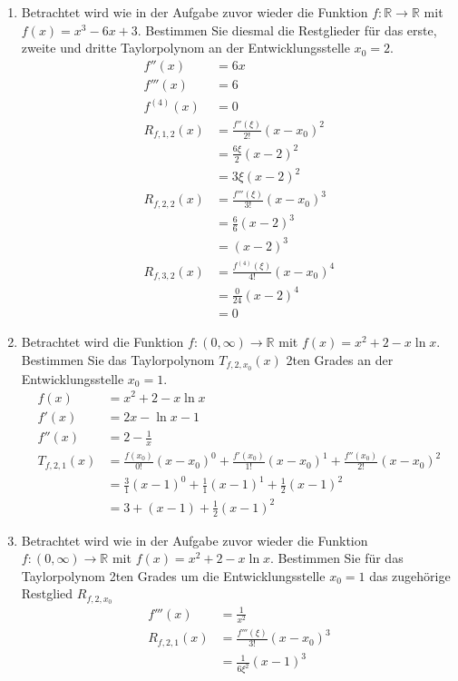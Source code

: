 \documentclass[12pt]{article}
\begin{document}
\begin{enumerate}[start=1,label={\bfseries Frage \arabic*:},leftmargin=1in]
    \item Betrachtet wird wie in der Aufgabe zuvor wieder die Funktion $f:\mathbb{R} \to \mathbb{R}$ mit $f(x)=x^{3}-6x+3$. Bestimmen Sie diesmal die Restglieder für das erste, zweite und dritte Taylorpolynom an der Entwicklungsstelle $x_0=2$.
    \begin{align*}
        f''(x)&=6x \\
        f'''(x)&=6 \\
        f^{(4)}(x)&=0 \\
        R_{f,1,2}(x)&=\frac{f''(\xi)}{2!}(x-x_0)^2 \\
        &=\frac{6\xi}{2}(x-2)^2 \\
        &=3\xi (x-2)^2 \\
        R_{f,2,2}(x)&=\frac{f'''(\xi)}{3!}(x-x_0)^3 \\
        &=\frac{6}{6}(x-2)^3 \\
        &=(x-2)^3 \\
        R_{f,3,2}(x)&=\frac{f^{(4)}(\xi)}{4!}(x-x_0)^4 \\
        &=\frac{0}{24}(x-2)^4 \\
        &=0
    \end{align*}

    \item Betrachtet wird die Funktion $f:(0,\infty) \to \mathbb{R}$ mit $f(x)=x^{2} + 2 - x \ln{x}$. Bestimmen Sie das Taylorpolynom $T_{f,2,x_0}(x)$ 2ten Grades an der Entwicklungsstelle $x_0=1$.
    \begin{align*}
        f(x)&=x^{2} + 2 - x \ln{x} \\
        f'(x)&=2x - \ln{x} - 1 \\
        f''(x)&=2 - \frac{1}{x} \\
        T_{f,2,1}(x)&=\frac{f(x_0)}{0!}(x-x_0)^0 + \frac{f'(x_0)}{1!}(x-x_0)^1 + \frac{f''(x_0)}{2!}(x-x_0)^2 \\
        &=\frac{3}{1}(x-1)^0 + \frac{1}{1}(x-1)^1 + \frac{1}{2}(x-1)^2 \\
        &=3 + (x-1) + \frac{1}{2}(x-1)^2
    \end{align*}

    \enlargethispage{-\baselineskip}
    \enlargethispage{-\baselineskip}
    \enlargethispage{-\baselineskip}
    \enlargethispage{-\baselineskip}
    \enlargethispage{-\baselineskip}
        
    \item Betrachtet wird wie in der Aufgabe zuvor wieder die Funktion $f:(0,\infty) \to \mathbb{R}$ mit $f(x)=x^{2} + 2 - x \ln{x}$. Bestimmen Sie für das Taylorpolynom  2ten Grades um die Entwicklungsstelle $x_0=1$ das zugehörige Restglied $R_{f,2,x_0}$
    \begin{align*}
        f'''(x)&=\frac{1}{x^2} \\
        R_{f,2,1}(x)&=\frac{f'''(\xi)}{3!}(x-x_0)^3 \\
        &=\frac{1}{6\xi^2}(x-1)^3 \\
    \end{align*}


\end{enumerate}
\end{document}
